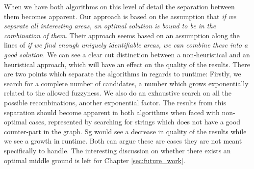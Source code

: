 \documentclass[thesis.tex]{subfiles}
\begin{document}
\par\noindent
When we have both algorithms on this level of detail the separation between them becomes apparent. Our approach is based on the assumption that \textit{if we separate all interesting areas, an optimal solution is bound to be in the combination of them}. Their approach seems based on an assumption along the lines of \textit{if we find enough uniquely identifiable areas, we can combine these into a good solution}. We can see a clear cut distinction between a non-heuristical and an heuristical approach, which will have an effect on the quality of the results. There are two points which separate the algorithms in regards to runtime: Firstly, we search for a complete number of candidates, a number which grows exponentially related to the allowed fuzzyness. We also do an exhaustive search on all the possible recombinations, another exponential factor. The results from this separation should become apparent in both algorithms when faced with non-optimal cases, represented by searching for strings which does not have a good counter-part in the graph. Sg would see a decrease in quality of the results while we see a growth in runtime. Both can argue these are cases they are not meant specifically to handle. The interesting discussion on whether there exists an optimal middle ground is left for Chapter \ref{sec:future_work}.
\end{document}
